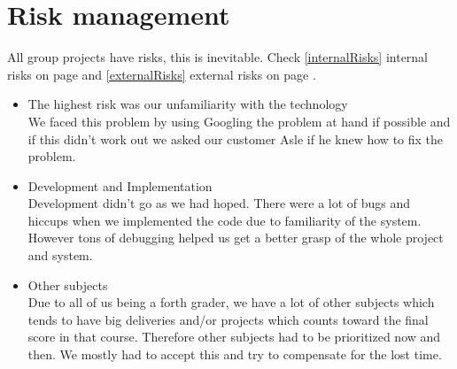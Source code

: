 \section{Risk management}
All group projects have risks, this is inevitable. Check \ref{internalRisks} internal risks on page \pageref{internalRisks} and \ref{externalRisks} external risks on page \pageref{externalRisks}.

\begin{itemize}
\item The highest risk was our unfamiliarity with the technology \\ We faced this problem by using Googling the problem at hand if possible and if this didn't work out we asked our customer Asle if he knew how to fix the problem.
\item Development and Implementation \\ Development didn't go as we had hoped. There were a lot of bugs and hiccups when we implemented the code due to familiarity of the system. However tons of debugging helped us get a better grasp of the whole project and system.
\item Other subjects \\Due to all of us being a forth grader, we have a lot of other subjects which tends to have big deliveries and/or projects which counts toward the final score in that course. Therefore other subjects had to be prioritized now and then. We mostly had to accept this and try to compensate for the lost time.


\end{itemize}
